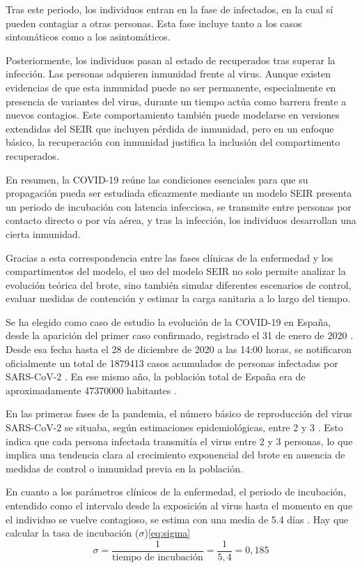 Tras este periodo, los individuos entran en la fase de infectados, en la cual sí pueden contagiar a otras personas. Esta fase incluye tanto a los casos sintomáticos como a los asintomáticos. 

Posteriormente, los individuos pasan al estado de recuperados tras superar la infección. Las personas adquieren inmunidad frente al virus. Aunque existen evidencias de que esta inmunidad puede no ser permanente, especialmente en presencia de variantes del virus, durante un tiempo actúa como barrera frente a nuevos contagios. Este comportamiento también puede modelarse en versiones extendidas del SEIR que incluyen pérdida de inmunidad, pero en un enfoque básico, la recuperación con inmunidad justifica la inclusión del compartimento recuperados.

En resumen, la COVID-19 reúne las condiciones esenciales para que su propagación pueda ser estudiada eficazmente mediante un modelo SEIR presenta un periodo de incubación con latencia infecciosa, se transmite entre personas por contacto directo o por vía aérea, y tras la infección, los individuos desarrollan una cierta inmunidad.

Gracias a esta correspondencia entre las fases clínicas de la enfermedad y los compartimentos del modelo, el uso del modelo SEIR no solo permite analizar la evolución teórica del brote, sino también simular diferentes escenarios de control, evaluar medidas de contención y estimar la carga sanitaria a lo largo del tiempo. 

Se ha elegido como caso de estudio la evolución de la COVID-19 en España, desde la aparición del primer caso confirmado, registrado el 31 de enero de 2020 \cite{primer_caso_covid_espana}. Desde esa fecha hasta el 28 de diciembre de 2020 a las 14:00 horas, se notificaron oficialmente un total de 1879413 casos acumulados de personas infectadas por SARS-CoV-2 \cite{sanidad_covid_situacion}. En ese mismo año, la población total de España era de aproximadamente 47370000 habitantes \cite{datacommons_espana_demografia}.

En las primeras fases de la pandemia, el número básico de reproducción del virus SARS-CoV-2 se situaba, según estimaciones epidemiológicas, entre 2 y 3 \cite{garcia_r0_desescalada}. Esto indica que cada persona infectada transmitía el virus entre 2 y 3 personas, lo que implica una tendencia clara al crecimiento exponencial del brote en ausencia de medidas de control o inmunidad previa en la población.

En cuanto a los parámetros clínicos de la enfermedad, el periodo de incubación, entendido como el intervalo desde la exposición al virus hasta el momento en que el individuo se vuelve contagioso, se estima con una media de 5.4 días \cite{lauer2020incubation}. Hay que calcular la tasa de incubación ($\sigma$)\eqref{eq:sigma}
\begin{equation}
\sigma = \frac{1}{\text{tiempo de incubación}} = \frac{1}{5{,}4} = 0{,}185
\label{eq:sigma}
\end{equation}

